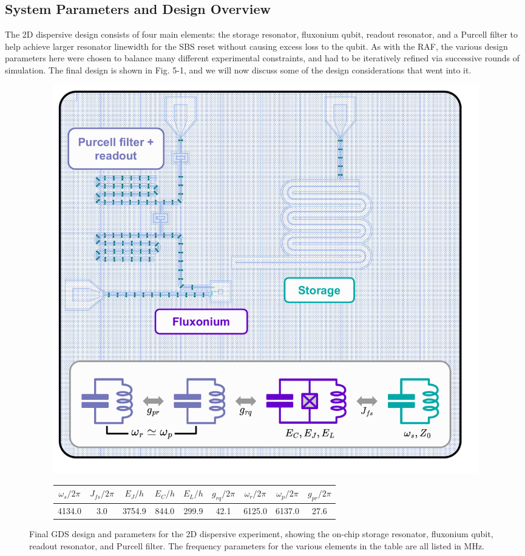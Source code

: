 \subsection{System Parameters and Design Overview}
The 2D dispersive design consists of four main elements: the storage resonator, fluxonium qubit, readout resonator, and a Purcell filter to help achieve larger resonator linewidth for the SBS reset without causing excess loss to the qubit. As with the RAF, the various design parameters here were chosen to balance many different experimental constraints, and had to be iteratively refined via successive rounds of simulation. The final design is shown in Fig. 5-1, and we will now discuss some of the design considerations that went into it.
\begin{figure}[h] 
    \begin{subfigure}{\linewidth}
        \centering
        \includegraphics[width=0.8\linewidth]{Figures/5/2D_Dispersive_GDS.pdf}
        \vspace*{2mm}
    \end{subfigure} 
    \begin{subfigure}{\linewidth}
        \centering
        \begin{tabular}{c|c|c|c|c|c|c|c|c }
       $\omega_s/2\pi$ & $J_{fs}/2\pi$ & $E_J/h$  & $E_C/h$ & $E_L/h$ & $g_{rq}/2\pi$ & $\omega_r/2\pi$ & $\omega_p/2\pi$ & $g_{pr}/2\pi$\\\hline
        4134.0 & 3.0 & 3754.9 & 844.0 & 299.9 & 42.1 & 6125.0 & 6137.0 & 27.6
    \end{tabular}
    \end{subfigure}
    \caption{Final GDS design and parameters for the 2D dispersive experiment, showing the on-chip storage resonator, fluxonium qubit, readout resonator, and Purcell filter. The frequency parameters for the various elements in the table are all listed in MHz.}
    \label{fig:5_2D_Dispersive_GDS}
\end{figure}

